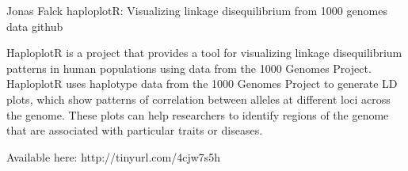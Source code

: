 

\begin{cventries}

\cventry
  {Jonas Falck}
  {haploplotR: Visualizing linkage disequilibrium from 1000 genomes data} %
  {github}
  {} %
  {    
  \begin{cvitems} %
    \item {HaploplotR is a project that provides a tool for visualizing linkage disequilibrium patterns in human populations using data from the 1000 Genomes Project. 
    HaploplotR uses haplotype data from the 1000 Genomes Project to generate LD plots, which show patterns of correlation between alleles at different loci across the genome. 
    These plots can help researchers to identify regions of the genome that are associated with particular traits or diseases.}
    \item {Available here: http://tinyurl.com/4cjw7s5h}
  \end{cvitems}
  }

\end{cventries}